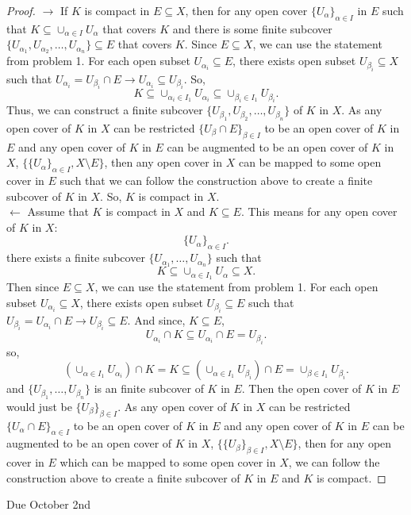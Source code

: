 \documentclass[a4paper]{article}
\begin{document}
\begin{proof}
  $\to$ If $K$ is compact in  $E \subseteq X$, then for any open cover $\{U_{\alpha}\}_{\alpha \in I}$ in $E$ such that
  $K \subseteq \cup_{\alpha \in I} U_{\alpha}$ 
  that covers $K$ and there is some finite subcover $\{U_{\alpha_1}, U_{\alpha_2}, \ldots, U_{\alpha_n}\} \subseteq E$ that
   covers $K$. Since $E \subseteq X$, we can use the statement from problem 1. For each open subset $U_{\alpha_i} \subseteq E$, there exists open subset $U_{\beta_i} \subseteq X$ such that $U_{\alpha_i} = U_{\beta_i} \cap E \to U_{\alpha_i} \subseteq U_{\beta_i}$. So,
\[
K \subseteq \cup_{\alpha_i \in I_1} U_{\alpha_i} \subseteq \cup_{\beta_i \in I_1} U_{\beta_i}
.\] 
Thus, we can construct a finite subcover $\{U_{\beta_1}, U_{\beta_2}, \ldots, U_{\beta_n}\}$ of $K$ in $X$. As any open cover of $K$ in  $X$ can be restricted $\{U_{\beta} \cap E\}_{\beta \in I}$ to be an open cover of $K$ in  $E$ and any open cover of  $K$ in  $E$ can be augmented to be an open  cover of  $K$ in  $X$,  $\{\{U_{\alpha}\}_{\alpha \in I}, X \setminus E\}$, then any open cover in $X$ can be mapped to some open cover in $E$ such that we can follow the construction above to create a finite subcover of $K$ in  $X$. So, $K$ is compact in  $X$. \\
  
  $\leftarrow$ Assume that $K$ is compact in $X$ and  $K \subseteq E$. This means for any open cover of $K$ in $X$:
  \[
  \{U_{\alpha}\}_{\alpha \in I} 
  .\]
  there exists a finite subcover $\{U_{\alpha_1}, \ldots, U_{\alpha_n}\} $ such that 
  \[
  K \subseteq \cup_{\alpha \in I_1} U_{\alpha} \subseteq X
  .\] 
  Then since $E \subseteq X$, we can use the statement from problem 1. For each open subset $U_{\alpha_i} \subseteq X$, there exists open subset $U_{\beta_i} \subseteq E$ such that $U_{\beta_i} = U_{\alpha_i} \cap E \to U_{\beta_i} \subseteq E$. And since, $K \subseteq E$, 
  \[
  U_{\alpha_i} \cap K \subseteq U_{\alpha_i} \cap E = U_{\beta_i}
  .\] 
  so,
  \[
    (\cup_{\alpha \in I_1} U_{\alpha_i}) \cap K = K \subseteq (\cup_{\alpha \in I_1} U_{\beta_i}) \cap E = \cup_{\beta \in I_1} U_{\beta_i}
  .\]
  and $\{U_{\beta_1}, \ldots, U_{\beta_n}\}$ is an finite subcover of $K$ in $E$.
  Then the open cover of $K$ in $E$ would just be $\{U_{\beta}\}_{\beta \in I}$. As any open cover of $K$ in  $X$ can be restricted $\{U_{\alpha} \cap E\}_{\alpha \in I}$ to be an open cover of $K$ in  $E$ and any open cover of  $K$ in  $E$ can be augmented to be an open  cover of  $K$ in  $X$,  $\{\{U_{\beta}\}_{\beta \in I}, X \setminus E\}$, then for any open cover in $E$ which can be mapped to some open cover in $X$, we can follow the construction above to create a finite subcover of $K$ in $E$ and $K$ is compact. 
\end{proof}

\Huge{Due October 2nd}
\end{document}
